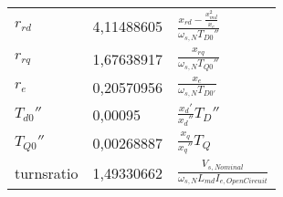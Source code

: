 \begin{longtable}[]{@{}lll@{}}
\begin{minipage}[t]{0.10\columnwidth}\raggedright
\(r_{rd}\)\strut
\end{minipage} & \begin{minipage}[t]{0.25\columnwidth}\raggedright
4,11488605\strut
\end{minipage} & \begin{minipage}[t]{0.55\columnwidth}\raggedright
\(\frac{x_{rd}-\frac{x_{md}^2}{x_e}}{\omega_{s,N}T_{D0}''}\)\strut
\end{minipage}\tabularnewline
\begin{minipage}[t]{0.10\columnwidth}\raggedright
\(r_{rq}\)\strut
\end{minipage} & \begin{minipage}[t]{0.25\columnwidth}\raggedright
1,67638917\strut
\end{minipage} & \begin{minipage}[t]{0.55\columnwidth}\raggedright
\(\frac{x_{rq}}{\omega_{s,N}T_{Q0}''}\)\strut
\end{minipage}\tabularnewline
\begin{minipage}[t]{0.10\columnwidth}\raggedright
\(r_e\)\strut
\end{minipage} & \begin{minipage}[t]{0.25\columnwidth}\raggedright
0,20570956\strut
\end{minipage} & \begin{minipage}[t]{0.55\columnwidth}\raggedright
\(\frac{x_e}{\omega_{s,N}T_{D0'}}\)\strut
\end{minipage}\tabularnewline
\begin{minipage}[t]{0.10\columnwidth}\raggedright
\(T_{d0}''\)\strut
\end{minipage} & \begin{minipage}[t]{0.25\columnwidth}\raggedright
0,00095\strut
\end{minipage} & \begin{minipage}[t]{0.55\columnwidth}\raggedright
\(\frac{x_d'}{x_d''}T_D''\)\strut
\end{minipage}\tabularnewline
\begin{minipage}[t]{0.10\columnwidth}\raggedright
\(T_{Q0}''\)\strut
\end{minipage} & \begin{minipage}[t]{0.25\columnwidth}\raggedright
0,00268887\strut
\end{minipage} & \begin{minipage}[t]{0.55\columnwidth}\raggedright
\(\frac{x_q}{x_q''}T_Q\)\strut
\end{minipage}\tabularnewline
\begin{minipage}[t]{0.10\columnwidth}\raggedright
turnsratio\strut
\end{minipage} & \begin{minipage}[t]{0.25\columnwidth}\raggedright
1,49330662\strut
\end{minipage} & \begin{minipage}[t]{0.55\columnwidth}\raggedright
\(\frac{V_{s,Nominal}}{\omega_{s,N}L_{md}I_{e,OpenCircuit}}\)\strut
\end{minipage}\tabularnewline
\bottomrule
\end{longtable}

